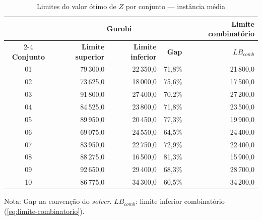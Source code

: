 \begin{table}[htbp]
    \caption{Limites do valor ótimo de $Z$ por conjunto --- instância média}
    \label{tab:res-limites-medio}
    \centering
    \begin{tabular}{crrrr}
        \hline
        & \multicolumn{3}{c}{\textbf{Gurobi}} & \textbf{Limite combinatório} \\
        \cline{2-4} \cline{5-5}
        \textbf{Conjunto} & \textbf{Limite superior} & \textbf{Limite inferior} & \textbf{Gap} & \textbf{$LB_{comb}$} \\
        \hline
        01 & 79\,300,0 & 22\,350,0 & 71,8\% & 21\,800,0 \\
        02 & 73\,625,0 & 18\,000,0 & 75,6\% & 17\,500,0 \\
        03 & 91\,800,0 & 27\,400,0 & 70,2\% & 27\,200,0 \\
        04 & 84\,525,0 & 23\,800,0 & 71,8\% & 23\,500,0 \\
        05 & 89\,950,0 & 20\,450,0 & 77,3\% & 19\,900,0 \\
        06 & 69\,075,0 & 24\,550,0 & 64,5\% & 24\,400,0 \\
        07 & 83\,950,0 & 22\,750,0 & 72,9\% & 22\,400,0 \\
        08 & 88\,275,0 & 16\,500,0 & 81,3\% & 15\,900,0 \\
        09 & 92\,650,0 & 29\,400,0 & 68,3\% & 28\,700,0 \\
        10 & 86\,775,0 & 34\,300,0 & 60,5\% & 34\,200,0 \\
        \hline
    \end{tabular}
    \par\smallskip
    {\footnotesize Nota: Gap na convenção do \textit{solver}. $LB_{comb}$: limite inferior combinatório (\autoref{eq:limite-combinatorio}).}
\end{table}

